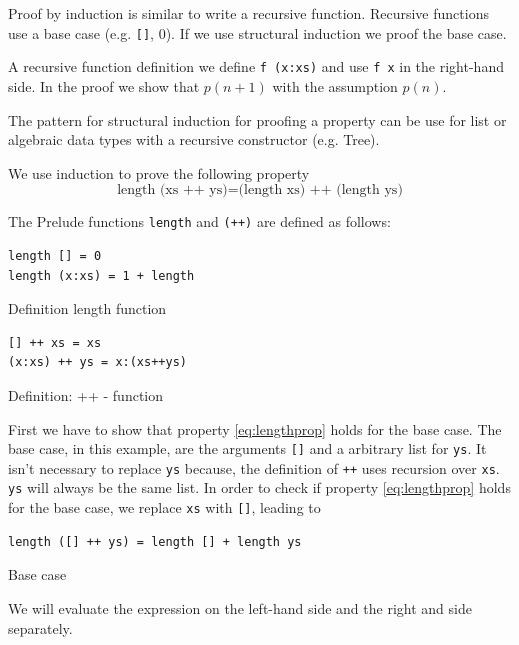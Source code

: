 \documentclass[twoside, a4paper, 12pt]{article}
\begin{document}
Proof by induction is similar to write a recursive function. Recursive functions use a base case (e.g. \verb|[]|, 0). 
If we use structural induction we proof the base case.

A recursive function definition we define \verb|f (x:xs)| and use \verb|f x| in the right-hand side. In the proof we show that $p(n+1)$ with the assumption $p(n)$.

The pattern for structural induction for proofing a property can be use for list or algebraic data types with a recursive constructor (e.g. Tree).

We use induction to prove the following property
\begin{equation}
  \label{eq:lengthprop}
  \text{length (xs ++ ys)} = \text{(length xs) ++ (length ys)}
\end{equation}

The Prelude functions \verb|length| and \verb|(++)| are defined as follows:
\begin{program}
\begin{verbatim}
length [] = 0
length (x:xs) = 1 + length 
\end{verbatim}
\caption{Definition length function}
\label{lst:lengthdefinition}  
\end{program}

\begin{program}
\begin{verbatim}
[] ++ xs = xs
(x:xs) ++ ys = x:(xs++ys)
\end{verbatim}
\caption{Definition: ++ - function}
\label{lst:catdefinition}  
\end{program}

First we have to show that property \ref{eq:lengthprop} holds for the base case. The base case, in this example, are the arguments \verb|[]| and a arbitrary list for \verb|ys|. It isn't necessary to replace \verb|ys| because, the definition of \verb|++| uses recursion over \verb|xs|. \verb|ys| will always be the same list.
In order to check if property \ref{eq:lengthprop} holds for the base case, we replace \verb|xs| with  \verb|[]|, leading to

\begin{program}
\begin{verbatim}
length ([] ++ ys) = length [] + length ys
\end{verbatim}
\caption{Base case}
\label{lst:equality1}
\end{program}

We will evaluate the expression on the left-hand side and the right and side separately.
\end{document}
